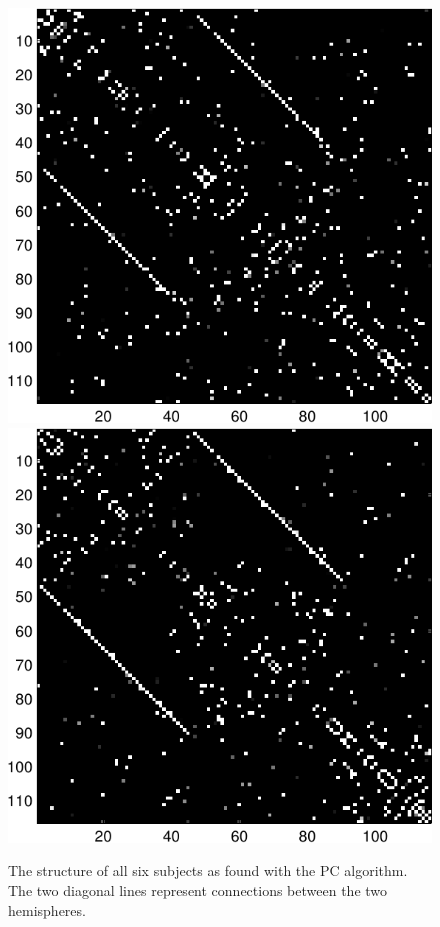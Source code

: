 \documentclass[a4paper, 10pt, english, onecolumn]{article}
\begin{document}
\begin{figure}[h!]
  \includegraphics[height=0.29\textheight]{images/new/struct_subj5-crop}
  \includegraphics[height=0.29\textheight]{images/new/struct_subj6-crop}
  \caption{The structure of all six subjects as found with the PC algorithm. The two diagonal lines represent connections between the two hemispheres.}
\label{fig:struct_subjects}
\end{figure}
\end{document}
